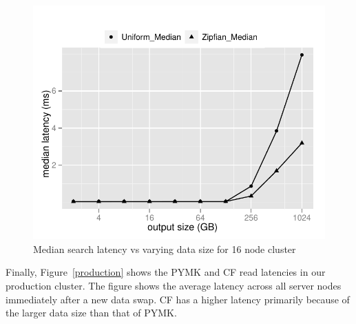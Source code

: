 \begin{figure}
  \centering
    \includegraphics[scale=0.55]{images/search_16node.pdf}
  \caption{Median search latency vs varying data size for 16 node cluster}
  \label{16search}
\end{figure}

Finally, Figure~\ref{production} shows the PYMK and CF read latencies
in our production cluster. The figure shows the average latency across
all server nodes immediately after a new data swap. CF has a higher
latency primarily because of the larger data size than that of PYMK.

